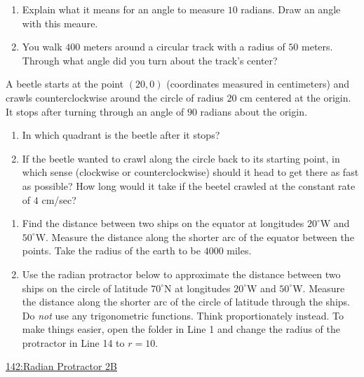 \documentclass{ximera}
\begin{document}
\begin{question}  \label{Q2873:Angles}
\begin{enumerate}
\item Explain what it means for an angle to measure $10$ radians. Draw an angle with this meaure.

\item You walk $400$ meters around a circular track with a radius of $50$ meters. Through what angle did you turn about the track's center?

\end{enumerate}

\end{question}

\begin{question} \label{Q9dfdEREFDF}
A beetle starts at the point $(20,0)$ (coordinates measured in centimeters) and crawls counterclockwise around the circle of radius $20$ cm centered at the origin. It stops after turning through an angle of $90$ radians about the origin.

\begin{enumerate}
\item In which quadrant is the beetle after it stops?

\item If the beetle wanted to crawl along the circle back to its starting point, in which sense (clockwise or counterclockwise) should it head to get there as fast as possible? How long would it take if the beetel crawled at the constant rate of $4$ cm/sec?
\end{enumerate}

\end{question}


\begin{question} \label{QPPPdfrr54g}

\begin{enumerate}
\item Find the distance between two ships on the equator at longitudes $20^\circ$W and $50^\circ$W. Measure the distance along the shorter arc of the equator between the points. Take the radius of the earth to be $4000$ miles.

\item Use the radian protractor below to approximate the distance between two ships on the circle of latitude $70^\circ$N at longitudes $20^\circ$W and $50^\circ$W. Measure the distance along the shorter arc of the circle of latitude through the ships. 
Do \emph{not} use any trigonometric functions. Think proportionately instead. To make things easier, open the folder in Line 1 and change the radius of the protractor in Line 14 to $r=10$.
\end{enumerate}

\begin{onlineOnly}
    \begin{center}
\end{center}

\href{https://www.desmos.com/calculator/vb1kvzkzlq}{142:Radian Protractor 2B}

\end{onlineOnly}
\end{question}
\end{document}
